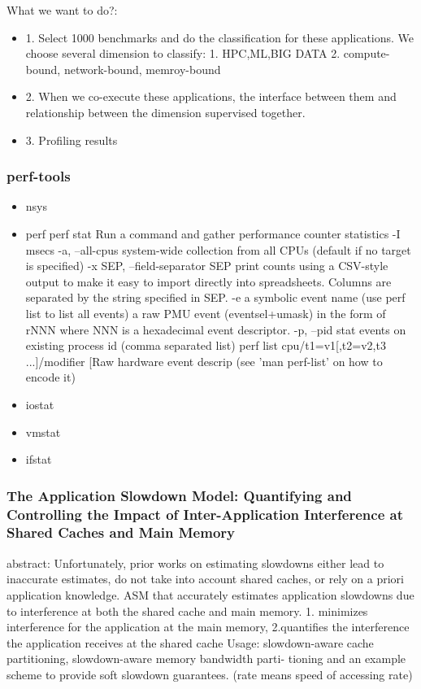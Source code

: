 \documentclass[UTF8]{article}
\begin{document}
What we want to do?:
\begin{itemize}
    \item 1. Select 1000 benchmarks and do the classification for these applications. We choose several dimension to classify: 1. HPC,ML,BIG DATA 2. compute-bound, network-bound, memroy-bound
    \item 2. When we co-execute these applications, the interface between them and relationship between the dimension supervised together.
    \item 3. Profiling results
\end{itemize}
\subsubsection{perf-tools}
\begin{itemize}
    \item nsys
	\item perf perf stat Run a command and gather performance counter statistics -I msecs -a, --all-cpus system-wide collection from all CPUs (default if no target is
specified) -x SEP, --field-separator SEP print counts using a CSV-style output to make it easy to import directly into spreadsheets. Columns are separated by the string specified in SEP. -e a symbolic event name (use perf list to list all events) a raw PMU event (eventsel+umask) in the form of rNNN where NNN is a hexadecimal event descriptor. -p, --pid stat events on existing process id (comma separated list) perf list cpu/t1=v1[,t2=v2,t3 ...]/modifier                  [Raw hardware event descrip (see 'man perf-list' on how to encode it)
	\item iostat
	\item vmstat
	\item ifstat
\end{itemize}

\subsubsection{The Application Slowdown Model: Quantifying and Controlling the Impact of Inter-Application Interference at Shared Caches and Main Memory}

abstract: Unfortunately, prior works on estimating slowdowns either lead to inaccurate estimates, do not take into account shared caches, or rely on a priori application knowledge. ASM that accurately estimates application slowdowns due to interference at both the shared cache and main memory.  1. minimizes interference for the application at the main memory, 2.quantifies the interference the application receives at the shared cache Usage: slowdown-aware cache partitioning, slowdown-aware memory bandwidth parti- tioning and an example scheme to provide soft slowdown guarantees. (rate means speed of accessing rate)
\end{document}
